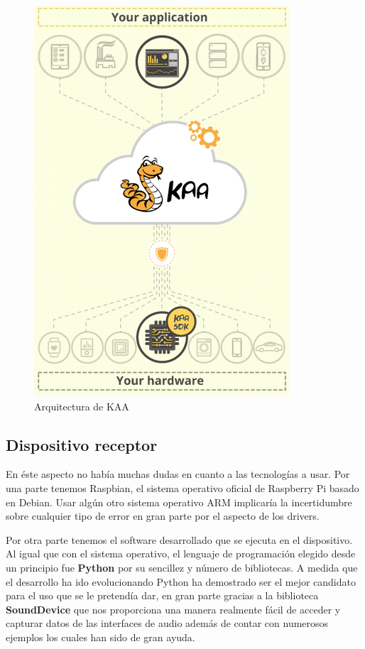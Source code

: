 \begin{figure}[ht]
  \begin{center}
    \includegraphics[scale=0.40]{../images/kaa/arqui.png}
		\caption{Arquitectura de KAA}
    \label{fig:kaalog}
	\end{center}
\end{figure}


\newpage

\subsection{Dispositivo receptor}

En éste aspecto no había muchas dudas en cuanto a las tecnologías a usar. Por una parte tenemos Raspbian, el sistema operativo oficial de Raspberry Pi basado en Debian. Usar algún otro sistema operativo ARM implicaría la incertidumbre sobre cualquier tipo de error en gran parte por el aspecto de los drivers.

\bigskip
Por otra parte tenemos el software desarrollado que se ejecuta en el dispositivo. Al igual que con el sistema operativo, el lenguaje de programación elegido desde un principio fue \textbf{Python} por su sencillez y número de bibliotecas. A medida que el desarrollo ha ido evolucionando Python ha demostrado ser el mejor candidato para el uso que se le pretendía dar, en gran parte gracias a la biblioteca \textbf{SoundDevice} que nos proporciona una manera realmente fácil de acceder y capturar datos de las interfaces de audio además de contar con numerosos ejemplos los cuales han sido de gran ayuda.

